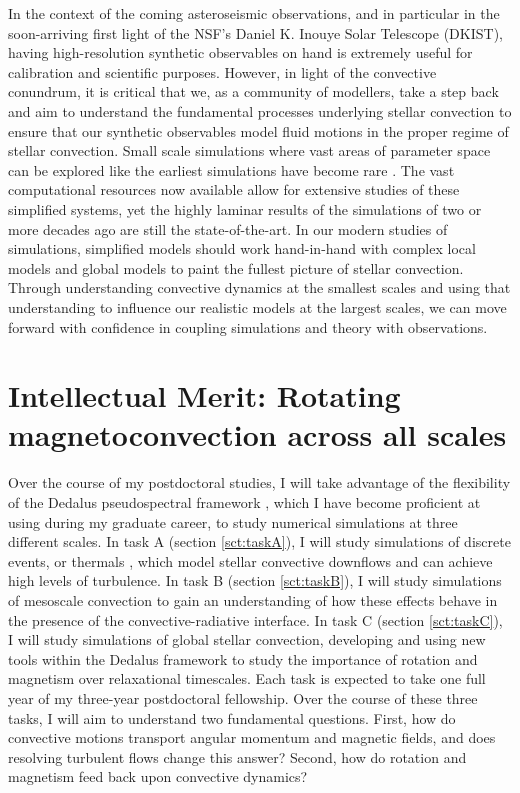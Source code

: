 \documentclass[aasms,11pt, longbibliography]{article}
\makeatletter
\renewcommand{\sectionmark}[1]{%
  \markboth{\ifnum \c@secnumdepth>\z@
      \thesection: \hskip 1em\relax
    \fi #1}{}}
\makeatother
\begin{document}
In the context of the coming asteroseismic observations, and in particular in the soon-arriving first light of the NSF's Daniel K. Inouye Solar Telescope (DKIST), having high-resolution synthetic observables on hand is extremely useful for calibration and scientific purposes.
However, in light of the convective conundrum, it is critical that we, as a community of modellers, take a step back and aim to understand the fundamental processes underlying stellar convection to ensure that our synthetic observables model fluid motions in the proper regime of stellar convection.
Small scale simulations where vast areas of parameter space can be explored like the earliest simulations have become rare \citep{wood&brummell2012, wood&brummell2018}.
The vast computational resources now available allow for extensive studies of these simplified systems, yet the highly laminar results of the simulations of two or more decades ago are still the state-of-the-art.
In our modern studies of simulations, simplified models \citep{brummell&all1998} should work hand-in-hand with complex local models \citep{rempel2014} and global models \citep{strugarek&all2018} to paint the fullest picture of stellar convection.
Through understanding convective dynamics at the smallest scales and using that understanding to influence our realistic models at the largest scales, we can move forward with confidence in coupling simulations and theory with observations.

\section{Intellectual Merit: Rotating magnetoconvection across all scales}
\sectionmark{Intellectual Merit}
\vspace{-6pt}

\label{sct:intellectual_merit}

Over the course of my postdoctoral studies, I will take advantage of the flexibility of the Dedalus pseudospectral framework \citep{burns&all2019}, which I have become proficient at using during my graduate career, to study numerical simulations at three different scales.
In task A (section \ref{sct:taskA}), I will study simulations of discrete events, or thermals \citep[as in ][]{andersLB2019}, which model stellar convective downflows and can achieve high levels of turbulence.
In task B (section \ref{sct:taskB}), I will study simulations of mesoscale convection \citep[as in ][]{anders&brown2017} to gain an understanding of how these effects behave in the presence of the convective-radiative interface.
In task C (section \ref{sct:taskC}), I will study simulations of global stellar convection, developing and using new tools within the Dedalus framework to study the importance of rotation and magnetism over relaxational timescales.
Each task is expected to take one full year of my three-year postdoctoral fellowship.
Over the course of these three tasks, I will aim to understand two fundamental questions.
First, how do convective motions transport angular momentum and magnetic fields, and does resolving turbulent flows change this answer?
Second, how do rotation and magnetism feed back upon convective dynamics?
\end{document}
